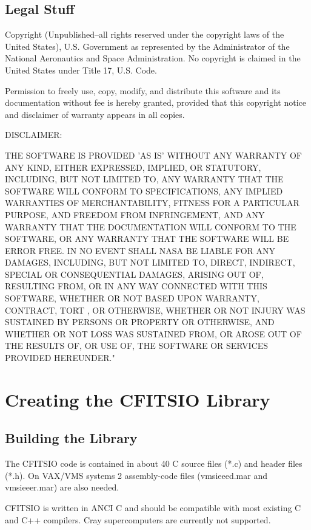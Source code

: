 \documentclass[11pt]{book}
\begin{document}
\section{Legal Stuff}

Copyright (Unpublished--all rights reserved under the copyright laws of
the United States), U.S. Government as represented by the Administrator
of the National Aeronautics and Space Administration.  No copyright is
claimed in the United States under Title 17, U.S. Code.

Permission to freely use, copy, modify, and distribute this software
and its documentation without fee is hereby granted, provided that this
copyright notice and disclaimer of warranty appears in all copies.

DISCLAIMER:

THE SOFTWARE IS PROVIDED 'AS IS' WITHOUT ANY WARRANTY OF ANY KIND,
EITHER EXPRESSED, IMPLIED, OR STATUTORY, INCLUDING, BUT NOT LIMITED TO,
ANY WARRANTY THAT THE SOFTWARE WILL CONFORM TO SPECIFICATIONS, ANY
IMPLIED WARRANTIES OF MERCHANTABILITY, FITNESS FOR A PARTICULAR
PURPOSE, AND FREEDOM FROM INFRINGEMENT, AND ANY WARRANTY THAT THE
DOCUMENTATION WILL CONFORM TO THE SOFTWARE, OR ANY WARRANTY THAT THE
SOFTWARE WILL BE ERROR FREE.  IN NO EVENT SHALL NASA BE LIABLE FOR ANY
DAMAGES, INCLUDING, BUT NOT LIMITED TO, DIRECT, INDIRECT, SPECIAL OR
CONSEQUENTIAL DAMAGES, ARISING OUT OF, RESULTING FROM, OR IN ANY WAY
CONNECTED WITH THIS SOFTWARE, WHETHER OR NOT BASED UPON WARRANTY,
CONTRACT, TORT , OR OTHERWISE, WHETHER OR NOT INJURY WAS SUSTAINED BY
PERSONS OR PROPERTY OR OTHERWISE, AND WHETHER OR NOT LOSS WAS SUSTAINED
FROM, OR AROSE OUT OF THE RESULTS OF, OR USE OF, THE SOFTWARE OR
SERVICES PROVIDED HEREUNDER."

\chapter{ Creating the CFITSIO Library }


\section{Building the Library}

The CFITSIO code is contained in about 40 C source files (*.c) and header
files (*.h). On VAX/VMS systems 2 assembly-code files (vmsieeed.mar and
vmsieeer.mar) are also needed.

CFITSIO is written in ANCI C and should be compatible with most existing C and C++
compilers. Cray supercomputers are currently not supported.
\end{document}
